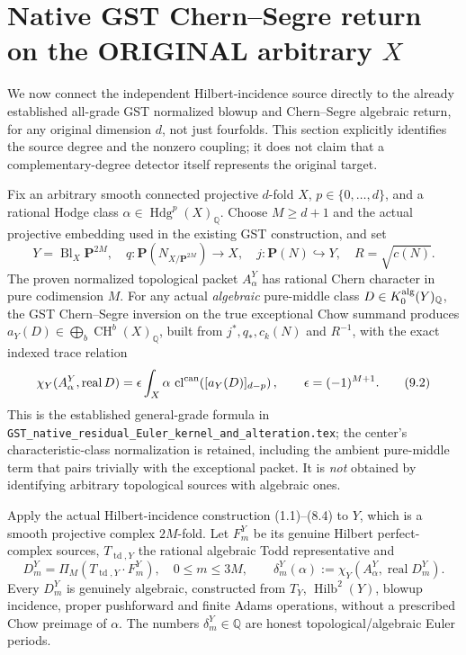 \documentclass[11pt]{article}
\newcommand{\Q}{\mathbb Q}
\newcommand{\CH}{\operatorname{CH}}
\newcommand{\td}{\operatorname{td}}
\newcommand{\cl}{\operatorname{cl}}
\newcommand{\Hilb}{\operatorname{Hilb}}
\begin{document}
\section{Native GST Chern--Segre return on the ORIGINAL arbitrary \(X\)}
We now connect the independent Hilbert-incidence source directly
to the already established all-grade GST normalized blowup
and Chern--Segre algebraic return, for any original dimension
\(d\), not just fourfolds. This section explicitly identifies
the source degree and the nonzero coupling; it does not claim
that a complementary-degree detector itself represents
the original target.

Fix an arbitrary smooth connected projective \(d\)-fold \(X\),
\(p\in\{0,\ldots,d\}\), and a rational Hodge class
\(\alpha\in\operatorname{Hdg}^p(X)_\Q\).
Choose \(M\ge d+1\) and the actual projective embedding
used in the existing GST construction, and set
\[
 Y=\operatorname{Bl}_X\mathbf P^{2M},\quad
 q:\mathbf P(N_{X/\mathbf P^{2M}})\to X,\quad
 j:\mathbf P(N)\hookrightarrow Y,\quad
 R=\sqrt{c(N)}.                                      \tag{9.1}
\]
The proven normalized topological packet \(A_\alpha^Y\)
has rational Chern character in pure codimension \(M\).
For any actual \emph{algebraic} pure-middle class
\(D\in K_0^{\rm alg}(Y)_\Q\), the GST Chern--Segre
inversion on the true exceptional Chow summand produces
\(
 a_Y(D)\in\bigoplus_b\CH^b(X)_\Q
\),
built from \(j^*,q_*,c_k(N)\) and \(R^{-1}\), with the
exact indexed trace relation
\[
 \chi_Y(A_\alpha^Y,\operatorname{real}D)
    =\epsilon\int_X\alpha\,
       \cl^{\rm can}\!\left([a_Y(D)]_{d-p}\right),
 \qquad \epsilon=(-1)^{M+1}.                        \tag{9.2}
\]
This is the established general-grade formula in
\texttt{GST\_native\_residual\_Euler\_kernel\_and\_alteration.tex};
the center's characteristic-class normalization is retained,
including the ambient pure-middle term that pairs trivially
with the exceptional packet. It is \emph{not} obtained by
identifying arbitrary topological sources with algebraic ones.

Apply the actual Hilbert-incidence construction
(1.1)--(8.4) to \(Y\), which is a smooth projective
complex \(2M\)-fold. Let \(F_m^Y\) be its genuine Hilbert
perfect-complex sources, \(T_{\td,Y}\) the rational
algebraic Todd representative and
\[
 D_m^Y=\Pi_M\left(T_{\td,Y}\cdot F_m^Y\right),
 \quad 0\le m\le3M,\qquad
 \delta_m^Y(\alpha)
    :=\chi_Y(A_\alpha^Y,\operatorname{real}D_m^Y).
                                                               \tag{9.3}
\]
Every \(D_m^Y\) is genuinely algebraic, constructed from
\(T_Y\), \(\Hilb^2(Y)\), blowup incidence, proper pushforward
and finite Adams operations, without a prescribed Chow
preimage of \(\alpha\). The numbers \(\delta_m^Y\in\Q\)
are honest topological/algebraic Euler periods.
\end{document}
